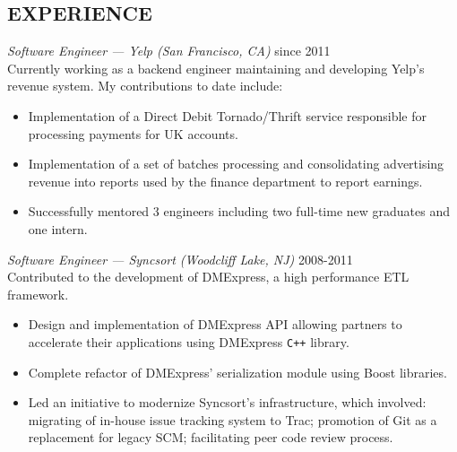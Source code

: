 \documentclass[line,margin]{src/res}
\begin{document}
\address{1335 Clay street, San Francisco, 94109, CA}

\begin{resume}

\section{EXPERIENCE}
                {\sl Software Engineer --- Yelp (San Francisco, CA)} \hfill since 2011 \\
                Currently working as a backend engineer maintaining and developing Yelp's revenue system. My contributions to date include:
                \begin{itemize}  \itemsep -2pt
                    \item Implementation of a Direct Debit Tornado/Thrift service responsible for processing payments for UK accounts.
                    \item Implementation of a set of batches processing and consolidating advertising revenue into reports used by the finance department to report earnings.
                    \item Successfully mentored 3 engineers including two full-time new graduates and one intern.
                \end{itemize}

                {\sl Software Engineer --- Syncsort (Woodcliff Lake, NJ)} \hfill 2008-2011 \\
                Contributed to the development of DMExpress, a high performance ETL framework.
                \begin{itemize}  \itemsep -2pt
                    \item Design and implementation of DMExpress API allowing partners to accelerate their applications using DMExpress \texttt{C++} library.
                    \item Complete refactor of DMExpress' serialization module using Boost libraries.
                    \item Led an initiative to modernize Syncsort's infrastructure, which involved: migrating of in-house issue tracking system to Trac; promotion of Git as a replacement for legacy SCM; facilitating peer code review process.
                \end{itemize}


\end{resume}
\end{document}
